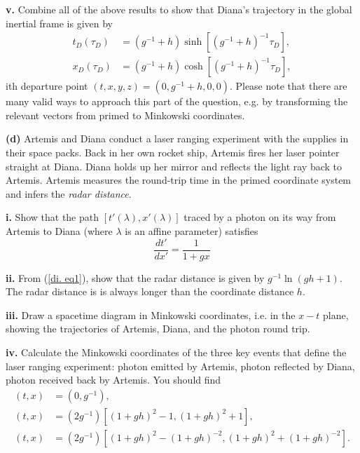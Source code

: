 \documentclass[a4paper]{article} %
\begin{document}
\begin{framed}
\textbf{v.} Combine all of the above results to show that Diana’s trajectory in the global inertial frame is given by
\begin{align}
t_D(\tau_D)&=(g^{-1}+h)\sinh[(g^{-1}+h)^{-1}\tau_D],\label{eq21}\\
x_D(\tau_D)&=(g^{-1}+h)\cosh[(g^{-1}+h)^{-1}\tau_D],\label{eq22}
\end{align}
ith departure point $(t,x,y,z)=(0,g^{-1}+h,0,0)$. Please note that there are many valid ways to approach this part of the question, e.g. by transforming the relevant vectors from primed to Minkowski coordinates.
\end{framed}

\begin{framed}
\textbf{(d)} Artemis and Diana conduct a laser ranging experiment with the supplies in their space packs. Back in her own rocket ship, Artemis fires her laser pointer straight at Diana. Diana holds up her mirror and reflects the light ray back to Artemis. Artemis measures the round-trip time in the primed coordinate system and infers the \emph{radar distance}.
\end{framed}

\begin{framed}
\textbf{i.} Show that the path $[t'(\lambda),x'(\lambda)]$ traced by a photon on its way from Artemis to Diana (where $\lambda$ is an affine parameter) satisfies
\begin{equation}
\frac{dt'}{dx'}=\frac{1}{1+gx}\label{di. eq1}
\end{equation}
\end{framed}

\begin{framed}
\textbf{ii.} From (\ref{di. eq1}), show that the radar distance is given by $g^{-1}\ln (gh+1)$. The radar distance is is always longer than the coordinate distance $h$.
\end{framed}

\begin{framed}
\textbf{iii.} Draw a spacetime diagram in Minkowski coordinates, i.e. in the $x-t$ plane, showing the trajectories of Artemis, Diana, and the photon round trip.
\end{framed}

\begin{framed}
\textbf{iv.} Calculate the Minkowski coordinates of the three key events that define the laser ranging experiment: photon emitted by Artemis, photon reflected by Diana, photon received back by Artemis. You should find
\begin{align}
(t,x)&=(0,g^{-1}),\\
(t,x)&=(2g^{-1})[(1+gh)^2-1,(1+gh)^2+1],\\
(t,x)&=(2g^{-1})[(1+gh)^2-(1+gh)^{-2},(1+gh)^2+(1+gh)^{-2}].
\end{align}
\end{framed}
\end{document}
